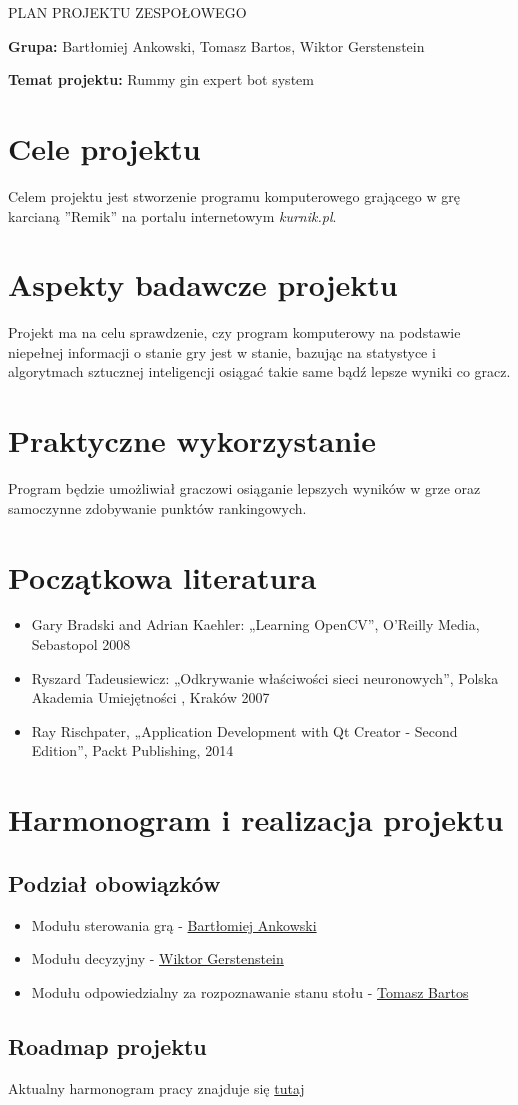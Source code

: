 \documentclass[a4paper, 11pt]{article}
\begin{document}
\title{}
\begin{center}
\Large{PLAN PROJEKTU ZESPOŁOWEGO}
\end{center} 

\textbf{Grupa:} Bartłomiej Ankowski, Tomasz Bartos, Wiktor Gerstenstein

\textbf{Temat projektu:} Rummy gin expert bot system

\section{Cele projektu}
Celem projektu jest stworzenie programu komputerowego grającego w grę karcianą ''Remik'' na portalu internetowym \textit{kurnik.pl}.

\section{Aspekty badawcze projektu}
Projekt ma na celu sprawdzenie, czy program komputerowy na podstawie niepełnej informacji o stanie gry  jest w stanie, bazując na statystyce i algorytmach sztucznej inteligencji osiągać takie same bądź lepsze wyniki co gracz.

\section{Praktyczne wykorzystanie}
Program będzie umożliwiał graczowi osiąganie lepszych wyników w grze oraz samoczynne zdobywanie punktów rankingowych.

\section{Początkowa literatura}
\begin{itemize}
\item Gary Bradski and Adrian Kaehler: „Learning OpenCV”, O’Reilly Media, Sebastopol 2008
\item Ryszard Tadeusiewicz: „Odkrywanie właściwości sieci neuronowych”, Polska Akademia Umiejętności , Kraków 2007
\item Ray Rischpater, „Application Development with Qt Creator - Second Edition”, Packt Publishing, 2014
\end{itemize}

\section{Harmonogram i realizacja projektu}

\subsection{Podział obowiązków}
\begin{itemize}
\item Modułu sterowania grą - \underline{Bartłomiej Ankowski}
\item Modułu decyzyjny - \underline{Wiktor Gerstenstein}
\item Modułu odpowiedzialny za rozpoznawanie stanu stołu - \underline{Tomasz Bartos}
\end{itemize}

\subsection{Roadmap projektu}
Aktualny harmonogram pracy znajduje się \href{https://trello.com/b/PmTsc0OK/team-project-art-roadmap}{tutaj}
\end{document}
